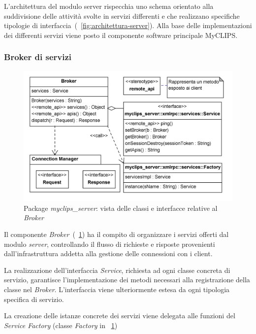 L'architettura del modulo server rispecchia uno schema orientato alla suddivisione delle attività svolte in servizi differenti e che realizzano specifiche tipologie di interfaccia~(\figurename~\ref{fig:architettura-server}). Alla base delle implementazioni dei differenti servizi viene posto il componente software principale MyCLIPS.

\subsubsection{Broker di servizi}

\begin{figure}
\centering
\includegraphics[width=1\textwidth]{Immagini/Capitolo3/Classi/myclips_server_Broker.png}
\caption{Package \emph{myclips\_server}: vista delle classi e interfacce relative al \emph{Broker}}\label{fig:class-myclips-server-broker}
\end{figure}

Il componente \emph{Broker}~(\figurename~\ref{fig:class-myclips-server-broker}) ha il compito di organizzare i servizi offerti dal modulo \emph{server}, controllando il flusso di richieste e risposte provenienti dall'infrastruttura addetta alla gestione delle connessioni con i client.

La realizzazione dell'interfaccia \emph{Service}, richiesta ad ogni classe concreta di servizio, garantisce l'implementazione dei metodi necessari alla registrazione della classe nel \emph{Broker}. L'interfaccia viene ulteriormente estesa da ogni tipologia specifica di servizio.

La creazione delle istanze concrete dei servizi viene delegata alle funzioni del \emph{Service Factory} (classe \emph{Factory} in \figurename~\ref{fig:class-myclips-server-broker})

